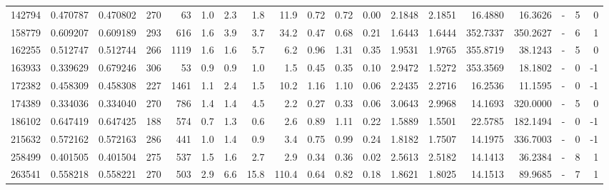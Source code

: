 \begin{tabular}{rrrrrrrrrrrrrrrrlrr}
    142794 & 0.470787 &   0.470802 &  270 &   63 &      1.0 &      2.3 &     1.8 &     11.9 &       0.72 &        0.72 &        0.00 &  2.1848 &  2.1851 &   16.4880 &   16.3626 &             - &        5 &          0 \\
    158779 & 0.609207 &   0.609189 &  293 &  616 &      1.6 &      3.9 &     3.7 &     34.2 &       0.47 &        0.68 &        0.21 &  1.6443 &  1.6444 &  352.7337 &  350.2627 &             - &        6 &          1 \\
    162255 & 0.512747 &   0.512744 &  266 & 1119 &      1.6 &      1.6 &     5.7 &      6.2 &       0.96 &        1.31 &        0.35 &  1.9531 &  1.9765 &  355.8719 &   38.1243 &             - &        5 &          0 \\
    163933 & 0.339629 &   0.679246 &  306 &   53 &      0.9 &      0.9 &     1.0 &      1.5 &       0.45 &        0.35 &        0.10 &  2.9472 &  1.5272 &  353.3569 &   18.1802 &             - &        0 &         -1 \\
    172382 & 0.458309 &   0.458308 &  227 & 1461 &      1.1 &      2.4 &     1.5 &     10.2 &       1.16 &        1.10 &        0.06 &  2.2435 &  2.2716 &   16.2536 &   11.1595 &             - &        0 &         -1 \\
    174389 & 0.334036 &   0.334040 &  270 &  786 &      1.4 &      1.4 &     4.5 &      2.2 &       0.27 &        0.33 &        0.06 &  3.0643 &  2.9968 &   14.1693 &  320.0000 &             - &        5 &          0 \\
    186102 & 0.647419 &   0.647425 &  188 &  574 &      0.7 &      1.3 &     0.6 &      2.6 &       0.89 &        1.11 &        0.22 &  1.5889 &  1.5501 &   22.5785 &  182.1494 &             - &        0 &         -1 \\
    215632 & 0.572162 &   0.572163 &  286 &  441 &      1.0 &      1.4 &     0.9 &      3.4 &       0.75 &        0.99 &        0.24 &  1.8182 &  1.7507 &   14.1975 &  336.7003 &             - &        0 &         -1 \\
    258499 & 0.401505 &   0.401504 &  275 &  537 &      1.5 &      1.6 &     2.7 &      2.9 &       0.34 &        0.36 &        0.02 &  2.5613 &  2.5182 &   14.1413 &   36.2384 &             - &        8 &          1 \\
    263541 & 0.558218 &   0.558221 &  270 &  503 &      2.9 &      6.6 &    15.8 &    110.4 &       0.64 &        0.82 &        0.18 &  1.8621 &  1.8025 &   14.1513 &   89.9685 &             - &        7 &          1 \\

\end{tabular}
